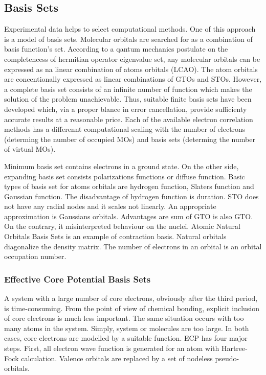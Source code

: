 \documentclass[
  digital, %
  table,   %
  lof,     %
  lot,     %
]{fithesis3}
\begin{document}
\subsection{Basis Sets}
 Experimental data helps to select computational methods. One of this approach is a model of basis sets. Molecular orbitals are searched for as a combination of basis function's set.
According to a qantum mechanics postulate on the completencess of hermitian operator eigenvalue set, any molecular orbitals can be expressed as na linear combination of atoms orbitals (LCAO). The atom orbitals are concentionally expressed as linear combinations of GTOs and STOs.
 However, a complete basis set consists of an infinite number of function which makes the solution of the problem unachievable. Thus, suitable finite basis sets have been developed which, via a proper blance in error cancellation, provide sufficienty accurate results at a reasonable price. Each of the available electron correlation methods has a differennt computational scaling with the number of electrons (determing the number of occupied MOs) and basis sets (determing the number of virtual MOs).

Minimum basis set contains electrons in a ground state. On the other side, expanding basis set consists polarizations functions or diffuse function. Basic types of basis set for atoms orbitals are hydrogen function, Slaters function and Gaussian function. The disadvantage of hydrogen function is duration. STO does not have any radial nodes and it scales not linearly. An appropriate approximation is Gaussians orbitals. Advantages are sum of GTO is also GTO. On the contrary, it misinterpreted behaviour on the nuclei.\cite{lowe2011quantum}
Atomic Natural Orbitals Basis Sets is an example of contraction basis. Natural orbitals diagonalize the density matrix. The number of electrons in an orbital is an orbital occupation number.
\subsubsection{Effective Core Potential Basis Sets}
A system with a large number of core electrons, obviously after the third period, is time-consuming. From the point of view of chemical bonding, explicit inclusion of core electrons is much less important. The same situation occurs with too many atoms in the system. Simply, system or molecules are too large. In both cases, core electrons are modelled by a suitable function. ECP has four major steps. First, all electron wave function is generated for an atom with Hartree-Fock calculation. Valence orbitals are replaced by a set of nodeless pseudo-orbitals.
\end{document}

